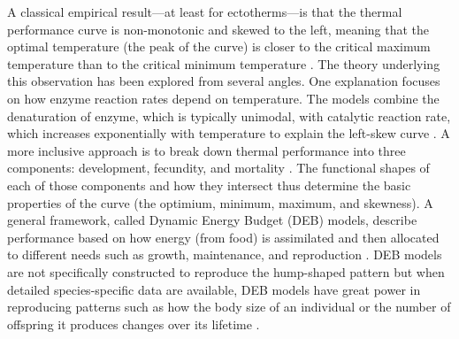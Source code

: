 A classical empirical result---at least for ectotherms---is that the thermal performance curve is non-monotonic and skewed to the left, meaning that the optimal temperature (the peak of the curve) is closer to the critical maximum temperature than to the critical minimum temperature \citep{Barlow1962,Huey2001,Angilletta2009}.
The theory underlying this observation has been explored from several angles.
One explanation focuses on how enzyme reaction rates depend on temperature.
The models combine the denaturation of enzyme, which is typically unimodal, with catalytic reaction rate, which increases exponentially with temperature to explain the left-skew curve \citep{VandH1996, VandH2002, Ratkowsky2005, Kingsolver2009}.
A more inclusive approach is to break down thermal performance into three components: development, fecundity, and mortality \citep{Amarasekare2012}.
The functional shapes of each of those components and how they intersect thus determine the basic properties of the curve (the optimium, minimum, maximum, and skewness).
A general framework, called Dynamic Energy Budget (DEB) models, describe performance based on how energy (from food) is assimilated and then allocated to different needs such as growth, maintenance, and reproduction \citep{Kooijman2009}.
DEB models are not specifically constructed to reproduce the hump-shaped pattern but when detailed species-specific data are available, DEB models have great power in reproducing patterns such as how the body size of an individual or the number of offspring it produces changes over its lifetime \citep{Nisbet2000}.

